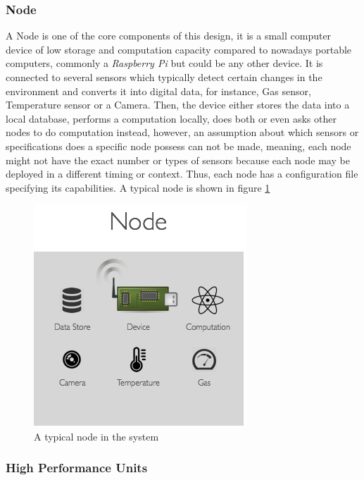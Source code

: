 \subsubsection{Node}
\label{subsub:node}
A Node is one of the core components of this design, it is a small computer device of low storage and computation capacity compared to nowadays portable computers, commonly a \textit{Raspberry Pi} but could be any other device. It is connected to several sensors which typically detect certain changes in the environment and converts it into digital data, for instance, Gas sensor, Temperature sensor or a Camera. Then, the device either stores the data into a local database, performs a computation locally, does both or even asks other nodes to do computation instead, however, an assumption about which sensors or specifications does a specific node  possess can not be made, meaning, each node might not have the exact number or types of sensors because each node may be deployed in a different timing or context. Thus, each node has a configuration file specifying its capabilities. A typical node is shown in figure \ref{fig:node}

\begin{figure}[H]
\centering
 \includegraphics[scale=0.4]{images/node.png}
 \caption{A typical node in the system}
 \label{fig:node}
\end{figure}

\subsubsection{High Performance  Units }

